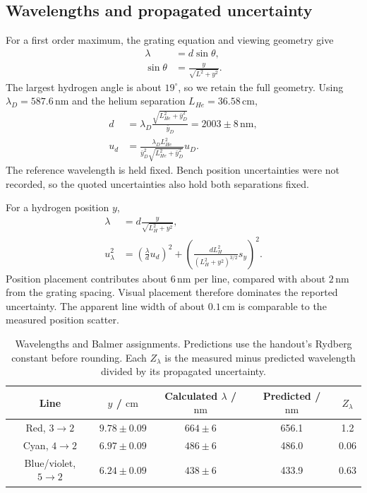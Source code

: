 \clearpage
\subsection{Wavelengths and propagated uncertainty}

For a first order maximum, the grating equation and viewing geometry give
\begin{align}
\lambda&=d\sin\theta, \\
\sin\theta&=\frac{y}{\sqrt{L^2+y^2}}.
\end{align}
The largest hydrogen angle is about $19^\circ$, so we retain the full geometry. Using $\lambda_D=587.6\,\text{nm}$ and the helium separation $L_{He}=36.58\,\text{cm}$,
\begin{align}
d&=\lambda_D\frac{\sqrt{L_{He}^2+\bar y_D^2}}{\bar y_D}=2003\pm8\,\text{nm}, \\
u_d&=\frac{\lambda_D L_{He}^2}{\bar y_D^2\sqrt{L_{He}^2+\bar y_D^2}}u_D.
\end{align}
The reference wavelength is held fixed. Bench position uncertainties were not recorded, so the quoted uncertainties also hold both separations fixed.

For a hydrogen position $y$,
\begin{align}
\lambda&=d\frac{y}{\sqrt{L_H^2+y^2}}, \\
u_\lambda^2&=\left(\frac{\lambda}{d}u_d\right)^2+
\left(\frac{dL_H^2}{(L_H^2+y^2)^{3/2}}s_y\right)^2.
\end{align}
Position placement contributes about $6\,\text{nm}$ per line, compared with about $2\,\text{nm}$ from the grating spacing. Visual placement therefore dominates the reported uncertainty. The apparent line width of about $0.1\,\text{cm}$ is comparable to the measured position scatter.

\begin{table}[H]
\centering
\begin{tabular}{ccccc}
\toprule
Line & $y$ / $\text{cm}$ & Calculated $\lambda$ / $\text{nm}$ & Predicted / $\text{nm}$ & $Z_\lambda$ \\
\midrule
Red, $3\to2$ & $9.78\pm0.09$ & $664\pm6$ & 656.1 & 1.2 \\
Cyan, $4\to2$ & $6.97\pm0.09$ & $486\pm6$ & 486.0 & 0.06 \\
Blue/violet, $5\to2$ & $6.24\pm0.09$ & $438\pm6$ & 433.9 & 0.63 \\
\bottomrule
\end{tabular}
\caption{Wavelengths and Balmer assignments. Predictions use the handout's Rydberg constant before rounding. Each $Z_\lambda$ is the measured minus predicted wavelength divided by its propagated uncertainty.}
\label{tab:hydrogen-wavelengths}
\end{table}

